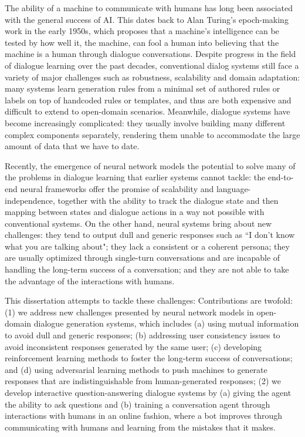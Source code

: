 The ability of a machine to communicate with humans has long been associated with the general success of AI. This dates back to 
Alan Turing's epoch-making work in 
the early 1950s, 
which proposes that  
a machine's intelligence 
can be tested by 
how well it, the machine, can fool a human
into believing that the machine is a human through dialogue conversations. 
Despite progress in the field of dialogue learning over the past decades, 
conventional dialog
systems 
still 
face a variety of major challenges such as robustness, scalability and domain adaptation: 
many systems 
 learn generation
rules from a minimal set of authored rules or
labels on top of  handcoded
rules or templates, and thus are both expensive
and difficult to extend to open-domain scenarios.
Meanwhile, dialogue systems have become increasingly 
complicated: they usually involve building many different complex components separately, rendering them unable to accommodate 
the large amount of data that we have to date. 

Recently, the emergence of neural network models the potential to solve many of the  problems 
in dialogue learning
that earlier systems cannot tackle:
the end-to-end neural frameworks
offer the promise of scalability
and language-independence,  together with the
ability to track the dialogue state and 
then mapping between states and dialogue actions
 in a way not possible with conventional 
systems.   
On the other hand,  neural systems  bring about new challenges: 
they tend to output dull and generic responses such as ``I don't know what you are talking about"; they lack a consistent or a coherent persona; they are usually optimized through single-turn conversations and are incapable of handling the long-term success of a conversation; and they are not able to take the advantage of the interactions with humans.


This dissertation 
attempts to tackle these challenges:
Contributions are twofold: 
(1) we address new challenges presented by  neural network models in open-domain dialogue generation systems, which includes (a) using mutual information to avoid dull and generic responses; (b) addressing user consistency issues to avoid inconsistent responses generated by the same user; (c) developing reinforcement learning 
methods to foster the long-term success of conversations; and (d) using adversarial learning methods to push machines to generate responses that are indistinguishable from human-generated responses; 
(2) we develop interactive 
question-answering
dialogue  systems by
(a) giving the agent the ability to ask questions and (b) training a conversation agent through interactions with humans in an
online fashion, where a bot improves through communicating with humans and  learning from the mistakes
that it makes. 


